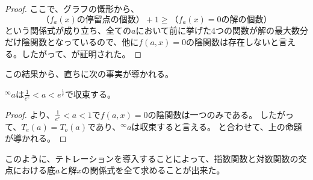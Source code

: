 \begin{proof}
		ここで、グラフの慨形から、
		\[
			\text{（$f_a(x)$の停留点の個数）} + 1 \geq \text{（$f_a(x)=0$の解の個数）}
		\]
		という関係式が成り立ち、全ての$a$において前に挙げた4つの関数が解の最大数分だけ陰関数となっているので、他に$f(a,x)=0$の陰関数は存在しないと言える。したがって、が証明された。
	\end{proof}
	
	この結果から、直ちに次の事実が導かれる。
	\begin{cor}
	\label{th:tetration_convergence}
		${^\infty a}$は$\frac{1}{e^e} < a < e^{\frac{1}{e}}$で収束する。
	\end{cor}
	\begin{proof}
		より、$\frac{1}{e^e} < a < 1$で$f(a,x)=0$の陰関数は一つのみである。
		したがって、$T_e(a) = T_o(a)$であり、${^\infty a}$は収束すると言える。
		と合わせて、上の命題が導かれる。
	\end{proof}
	
	このように、テトレーションを導入することによって、指数関数と対数関数の交点における底$a$と解$x$の関係式を全て求めることが出来た。
	
